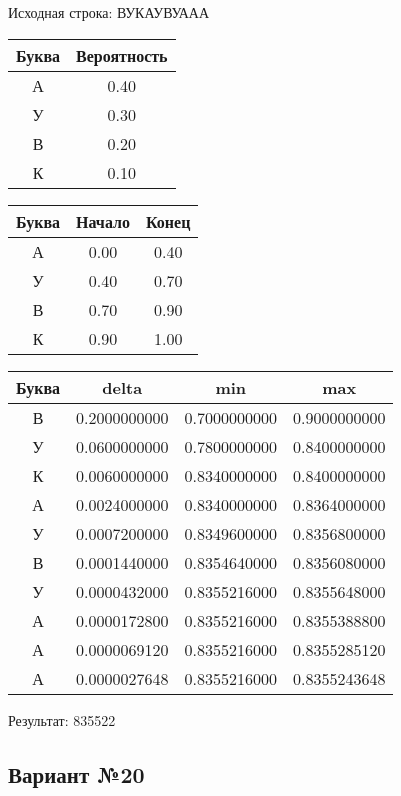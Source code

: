 \documentclass[a4paper, 12pt]{article}
\begin{document}
Исходная строка: ВУКАУВУААА\
\begin{center}
 \begin{tabular}{ |c|c| } 
  \hline
     Буква & Вероятность \\ \hline
А & 0.40\\\hline
У & 0.30\\\hline
В & 0.20\\\hline
К & 0.10
\\ \hline \end{tabular}
\end{center}
\begin{center}
 \begin{tabular}{ |c|c|c| } 
  \hline
     Буква & Начало & Конец \\ \hline
А & 0.00 & 0.40\\\hline
У & 0.40 & 0.70\\\hline
В & 0.70 & 0.90\\\hline
К & 0.90 & 1.00
\\ \hline \end{tabular}
\end{center}
\begin{center}
 \begin{tabular}{ |c|c|c|c| } 
  \hline
     Буква & delta & min & max \\ \hline
В & 0.2000000000 & 0.7000000000 & 0.9000000000\\\hline
У & 0.0600000000 & 0.7800000000 & 0.8400000000\\\hline
К & 0.0060000000 & 0.8340000000 & 0.8400000000\\\hline
А & 0.0024000000 & 0.8340000000 & 0.8364000000\\\hline
У & 0.0007200000 & 0.8349600000 & 0.8356800000\\\hline
В & 0.0001440000 & 0.8354640000 & 0.8356080000\\\hline
У & 0.0000432000 & 0.8355216000 & 0.8355648000\\\hline
А & 0.0000172800 & 0.8355216000 & 0.8355388800\\\hline
А & 0.0000069120 & 0.8355216000 & 0.8355285120\\\hline
А & 0.0000027648 & 0.8355216000 & 0.8355243648
\\ \hline \end{tabular}
\end{center}
Результат: 835522
\pagebreak
\subsection{Вариант №20}
\end{document}
